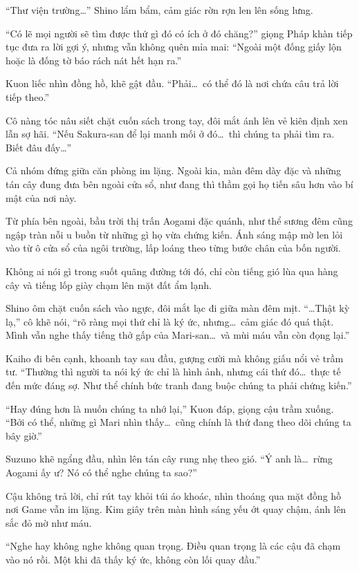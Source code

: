 \documentclass[../main.tex]{subfiles}
\begin{document}
``Thư viện trường\dots'' Shino lẩm bẩm, cảm giác rờn rợn len lên sống lưng.

``Có lẽ mọi người sẽ tìm được thứ gì đó có ích ở đó chăng?'' giọng Pháp khàn tiếp tục đưa ra lời gợi ý, nhưng vẫn không quên mỉa mai: ``Ngoài một đống giấy lộn hoặc là đống tờ báo rách nát hết hạn ra.''

Kuon liếc nhìn đồng hồ, khẽ gật đầu. ``Phải\dots\ có thể đó là nơi chứa câu trả lời tiếp theo.''

Cô nàng tóc nâu siết chặt cuốn sách trong tay, đôi mắt ánh lên vẻ kiên định xen lẫn sợ hãi. ``Nếu Sakura-san để lại manh mối ở đó\dots\ thì chúng ta phải tìm ra. Biết đâu đấy\dots''

Cả nhóm đứng giữa căn phòng im lặng. Ngoài kia, màn đêm dày đặc và những tán cây đung đưa bên ngoài cửa sổ, như đang thì thầm gọi họ tiến sâu hơn vào bí mật của nơi này.

Từ phía bên ngoài, bầu trời thị trấn Aogami đặc quánh, như thể sương đêm cũng ngập tràn nỗi u buồn từ những gì họ vừa chứng kiến. Ánh sáng mập mờ len lỏi vào từ ô cửa sổ của ngôi trường, lấp loáng theo từng bước chân của bốn người.

Không ai nói gì trong suốt quãng đường tới đó, chỉ còn tiếng gió lùa qua hàng cây và tiếng lốp giày chạm lên mặt đất ẩm lạnh.

Shino ôm chặt cuốn sách vào ngực, đôi mắt lạc đi giữa màn đêm mịt.
``\dots Thật kỳ lạ,'' cô khẽ nói, ``rõ ràng mọi thứ chỉ là ký ức, nhưng\dots\ cảm giác đó quá thật. Mình vẫn nghe thấy tiếng thở gấp của Mari-san\dots\ và mùi máu vẫn còn đọng lại.''

Kaiho đi bên cạnh, khoanh tay sau đầu, gượng cười mà không giấu nổi vẻ trầm tư. ``Thường thì người ta nói ký ức chỉ là hình ảnh, nhưng cái thứ đó\dots\ thực tế đến mức đáng sợ. Như thể chính bức tranh đang buộc chúng ta phải chứng kiến.''

``Hay đúng hơn là muốn chúng ta nhớ lại,'' Kuon đáp, giọng cậu trầm xuống. ``Bởi có thể, những gì Mari nhìn thấy\dots\ cũng chính là thứ đang theo dõi chúng ta bây giờ.''

Suzuno khẽ ngẩng đầu, nhìn lên tán cây rung nhẹ theo gió. ``Ý anh là\dots\ rừng Aogami ấy ư? Nó có thể nghe chúng ta sao?''

Cậu không trả lời, chỉ rút tay khỏi túi áo khoác, nhìn thoáng qua mặt đồng hồ nơi Game vẫn im lặng. Kim giây trên màn hình sáng yếu ớt quay chậm, ánh lên sắc đỏ mờ như máu.

``Nghe hay không nghe không quan trọng. Điều quan trọng là các cậu đã chạm vào nó rồi. Một khi đã thấy ký ức, không còn lối quay đầu.''
\end{document}
